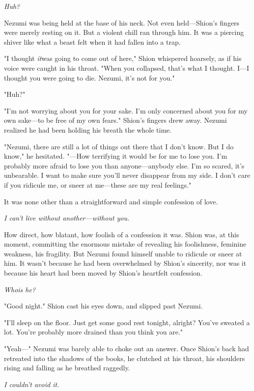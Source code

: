 \emph{Huh?}

Nezumi was being held at the base of his neck. Not even held---Shion's
fingers were merely resting on it. But a violent chill ran through him.
It was a piercing shiver like what a beast felt when it had fallen into
a trap.

"I thought \emph{it}\el was going to come out of here," Shion whispered
hoarsely, as if his voice were caught in his throat. "When you
collapsed, that's what I thought. I---I thought you were going to die.
Nezumi, it's not for you."

"Huh?"

"I'm not worrying about you for your sake. I'm only concerned about you
for my own sake---to be free of my own fears." Shion's fingers drew away.
Nezumi realized he had been holding his breath the whole time.

"Nezumi, there are still a lot of things out there that I don't know.
But I do know," he hesitated. "---How terrifying it would be for me to
lose you. I'm probably more afraid to lose you than anyone---anybody else.
I'm so scared, it's unbearable. I want to make sure you'll never
disappear from my side. I don't care if you ridicule me, or sneer at
me---these are my real feelings."

It was none other than a straightforward and simple confession of love.

\emph{I can't live without another---without you.}

How direct, how blatant, how foolish of a confession it was. Shion was,
at this moment, committing the enormous mistake of revealing his
foolishness, feminine weakness, his fragility. But Nezumi found himself
unable to ridicule or sneer at him. It wasn't because he had been
overwhelmed by Shion's sincerity, nor was it because his heart had been
moved by Shion's heartfelt confession.

\emph{Who\el is he\el ?}

"Good night." Shion cast his eyes down, and slipped past Nezumi.

"I'll sleep on the floor. Just get some good rest tonight, alright?
You've sweated a lot. You're probably more drained than you think you
are."

"Yeah---" Nezumi was barely able to choke out an answer. Once Shion's back
had retreated into the shadows of the books, he clutched at his throat,
his shoulders rising and falling as he breathed raggedly.

\emph{I couldn't avoid it.}

